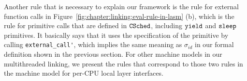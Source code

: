 Another rule that is necessary to explain our framework is the rule for external function calls in Figure~\ref{fig:chapter:linking:eval-rule-in-lasm} (b),
which is the rule for primitive calls that are defined in ${{\mathrm{\texttt{CSched}}}}$, including ${\mathrm{\texttt{yield}}}$ and ${\mathrm{\texttt{sleep}}}$ primitives.
It basically says that it uses 
the specification of the primitive by calling \lstinline$external_call'$,
which implies the same meaning as $\sigma_{id}$ in our formal definition shown in the previous section.
For other machine models in our multithreaded linking,
we present the rules that correspond to those two rules in the machine model for per-CPU local layer interfaces.


%
%
